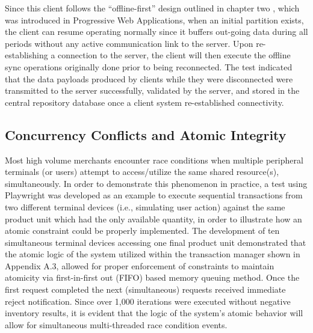 Since this client follows the ``offline-first'' design outlined in chapter two \cite{google2020offline}, which was introduced in Progressive Web Applications, when an initial partition exists, the client can resume operating normally since it buffers out-going data during all periods without any active communication link to the server. Upon re-establishing a connection to the server, the client will then execute the offline sync operations originally done prior to being reconnected. The test indicated that the data payloads produced by clients while they were disconnected were transmitted to the server successfully, validated by the server, and stored in the central repository database once a client system re-established connectivity.
\subsection{Concurrency Conflicts and Atomic Integrity}
Most high volume merchants encounter race conditions when multiple peripheral terminals (or users) attempt to access/utilize the same shared resource(s), simultaneously. In order to demonstrate this phenomenon in practice, a test using Playwright was developed as an example to execute sequential transactions from two different terminal devices (i.e., simulating user action) against the same product unit which had the only available quantity, in order to illustrate how an atomic constraint could be properly implemented. The development of ten simultaneous terminal devices accessing one final product unit demonstrated that the atomic logic of the system utilized within the transaction manager shown in Appendix A.3, allowed for proper enforcement of constraints to maintain atomicity via first-in-first out (FIFO) based memory queuing method. Once the first request completed the next (simultaneous) requests received immediate reject notification. Since over 1,000 iterations were executed without negative inventory results, it is evident that the logic of the system's atomic behavior will allow for simultaneous multi-threaded race condition events.

